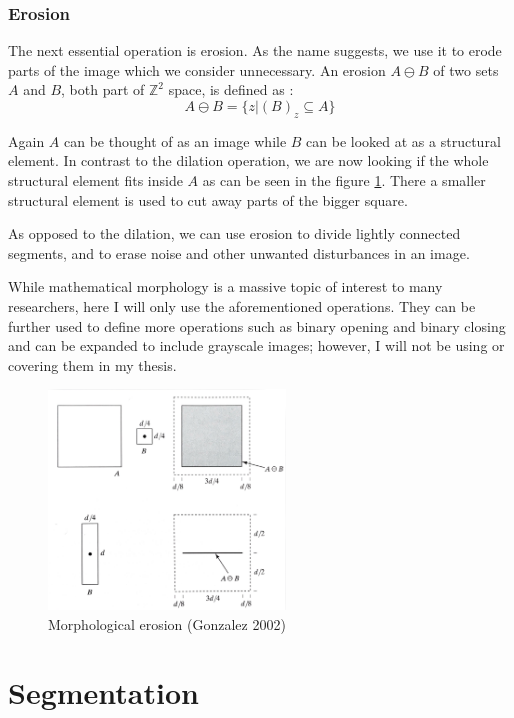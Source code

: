 \documentclass[
  digital,     %
  oneside,     %
  nosansbold,  %
  nocolorbold, %
  lof,         %
  lot,         %
]{fithesis4}
\newcommand*{\Z}{\ensuremath{\mathbb{Z}}}
\begin{document}
\subsubsection{Erosion}

The next essential operation is erosion. As the name suggests, we use it to
erode parts of the image which we consider unnecessary. An erosion $A \ominus B$
of two sets $A$ and $B$, both part of $\Z^2$ space, is defined as
\parencite{gonzalez2002}: $$A \ominus B = \{z | (B)_z \subseteq A\}$$

Again $A$ can be thought of as an image while $B$ can be looked at as a
structural element. In contrast to the dilation operation, we are now looking if
the whole structural element fits inside $A$ as can be seen in the figure
\ref{fig:morph_erosion}. There a smaller structural element is used to cut away
parts of the bigger square.

As opposed to the dilation, we can use erosion to divide lightly connected
segments, and to erase noise and other unwanted disturbances in an image.

While mathematical morphology is a massive topic of interest to many
researchers, here I will only use the aforementioned operations. They can be
further used to define more operations such as binary opening and binary closing
and can be expanded to include grayscale images; however, I will not be using or
covering them in my thesis.

\begin{figure}
    \begin{center}
        \includegraphics[width=6.3cm]{resources/morph_erosion.jpg}
    \end{center}
    \caption{Morphological erosion (Gonzalez 2002)} %
    \label{fig:morph_erosion}
\end{figure}

\section{Segmentation}
\end{document}
